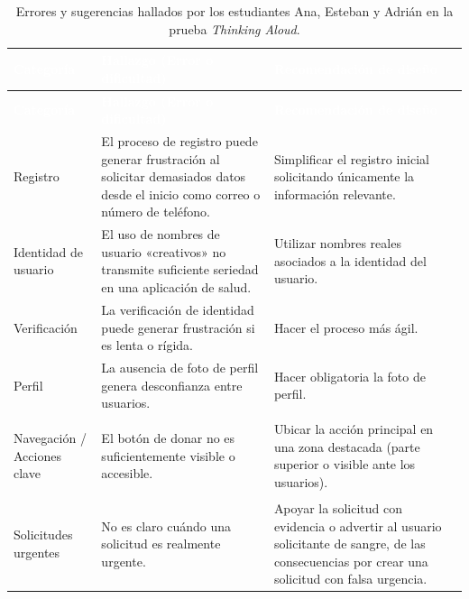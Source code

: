 \vspace{0.6em}

\begin{longtable}{%
  |>{\bfseries\centering\arraybackslash}p{2.8cm}%
  |>{\raggedright\arraybackslash}p{6cm}%
  |>{\raggedright\arraybackslash}p{6cm}|}

\caption{Errores y sugerencias hallados por los estudiantes Ana, Esteban y Adrián
  en la prueba \textit{Thinking Aloud}.}
\label{tab:thinking_aloud}\\

\hline
\rowcolor{darkgray}
\textcolor{white}{\textbf{Categoría}} &
\textcolor{white}{\textbf{Hallazgo (Error o dificultad)}} &
\textcolor{white}{\textbf{Recomendación de diseño}} \\
\hline
\endfirsthead

\hline
\rowcolor{darkgray}
\textcolor{white}{\textbf{Categoría}} &
\textcolor{white}{\textbf{Hallazgo (Error o dificultad)}} &
\textcolor{white}{\textbf{Recomendación de diseño}} \\
\hline
\endhead

\hline
\endfoot

\hline
\endlastfoot

Registro &
El proceso de registro puede generar frustración al solicitar demasiados datos desde el inicio
como correo o número de teléfono. &
Simplificar el registro inicial solicitando únicamente la información relevante. \\
\hline

Identidad de usuario &
El uso de nombres de usuario «creativos» no transmite suficiente seriedad en una aplicación
de salud. &
Utilizar nombres reales asociados a la identidad del usuario. \\
\hline

Verificación &
La verificación de identidad puede generar frustración si es lenta o rígida. &
Hacer el proceso más ágil. \\
\hline

Perfil &
La ausencia de foto de perfil genera desconfianza entre usuarios. &
Hacer obligatoria la foto de perfil. \\
\hline

Navegación / Acciones clave &
El botón de donar no es suficientemente visible o accesible. &
Ubicar la acción principal en una zona destacada (parte superior o visible ante los usuarios). \\
\hline

Solicitudes urgentes &
No es claro cuándo una solicitud es realmente urgente. &
Apoyar la solicitud con evidencia o advertir al usuario solicitante de sangre, de las
consecuencias por crear una solicitud con falsa urgencia. \\
\hline


\end{longtable}
